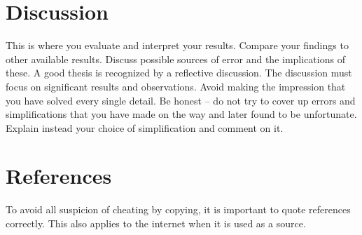 \documentclass{article}
\begin{document}
\section{Discussion}
This is where you evaluate and interpret your results. Compare your findings to
other available results. Discuss possible sources of error and the implications of these. A good
thesis is recognized by a reflective discussion. The discussion must focus on significant
results and observations. Avoid making the impression that you have solved every single
detail. Be honest – do not try to cover up errors and simplifications that you have made on the
way and later found to be unfortunate. Explain instead your choice of simplification and
comment on it. 
\pagebreak

\section{References}
To avoid all suspicion of cheating by copying, it is important to quote references
correctly. This also applies to the internet when it is used as a source. 
\end{document}
